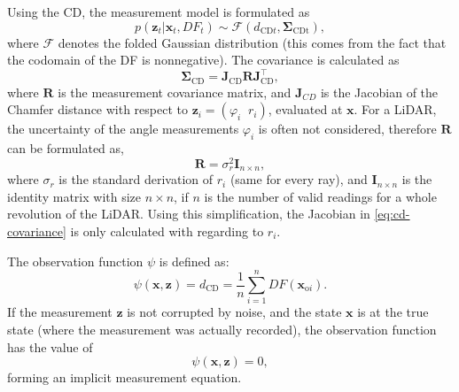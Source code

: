 Using the CD, the measurement model is formulated as
\begin{equation}
    p(\mathbf{\mathbf{z}}_t | \mathbf{x}_t, DF_t) \sim \mathcal{F}(d_{\text{CD}t},\boldsymbol\Sigma_{\text{CDt}}),
\end{equation}
where $\mathcal{F}$ denotes the folded Gaussian distribution (this comes from the fact that the codomain of the DF is nonnegative).
The covariance is calculated as
\begin{equation}\label{eq:cd-covariance}
    \boldsymbol\Sigma_{\text{CD}} = \mathbf{J}_{\text{CD}}\mathbf{R}\mathbf{J}_{\text{CD}}^{\top},
\end{equation}
where $\mathbf{R}$ is the measurement covariance matrix, and $\mathbf{J}_{CD}$ is the Jacobian of the
Chamfer distance with respect to $\mathbf{z}_i = (\varphi_i\;\;r_i)$,
evaluated at $\mathbf{x}$.
For a LiDAR, the uncertainty of the angle measurements $\varphi_i$ is often not considered,
therefore $\mathbf{R}$ can be formulated as,
\begin{equation}\label{eq:lidar-meas-covar}
    \mathbf{R} = \sigma_r^{2}\mathbf{I}_{n\times n},
\end{equation}
where $\sigma_r$ is the standard derivation of $r_i$ (same for every ray),
and $\mathbf{I}_{n\times n}$ is the identity matrix with size $n\times n$,
if $n$ is the number of valid readings for a whole revolution of the LiDAR.
Using this simplification, the Jacobian in \eqref{eq:cd-covariance}
is only calculated with regarding to $r_i$.

The observation function $\psi$ is defined as:
\begin{equation}\label{eq:observation-function}
    \psi(\mathbf{x},\mathbf{z}) = d_{\text{CD}} = \frac{1}{n}\sum_{i=1}^{n}DF(\mathbf{x}_{\text{o}i}).
\end{equation}
If the measurement $\mathbf{z}$ is not corrupted by noise, and the state $\mathbf{x}$
is at the true state (where the measurement was actually recorded), the observation
function has the value of
\begin{equation}\label{eq:impl-meas-eq}
    \psi(\mathbf{x},\mathbf{z}) = 0,
\end{equation}
forming an implicit measurement equation.


